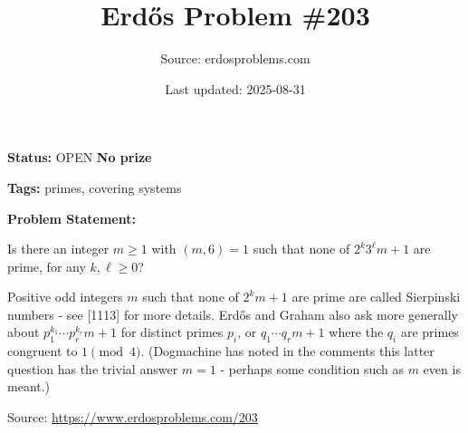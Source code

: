 \documentclass{article}
\title{Erd\H{o}s Problem \#203}
\date{Last updated: 2025-08-31}
\author{Source: erdosproblems.com}
\begin{document}
\maketitle

\noindent\textbf{Status:} OPEN \quad \textbf{No prize}

\noindent\textbf{Tags:} primes, covering systems

\medskip

\noindent\textbf{Problem Statement:}

Is there an integer $m\geq 1$ with $(m,6)=1$ such that none of $2^k3^\ell m+1$ are prime, for any $k,\ell\geq 0$?




Positive odd integers $m$ such that none of $2^km+1$ are prime are called Sierpinski numbers - see [1113] for more details. Erd\H{o}s and Graham also ask more generally about $p_1^{k_1}\cdots p_r^{k_r}m+1$ for distinct primes $p_i$, or $q_1\cdots q_rm+1$ where the $q_i$ are primes congruent to $1\pmod{4}$. (Dogmachine has noted in the comments this latter question has the trivial answer $m=1$ - perhaps some condition such as $m$ even is meant.)


\bigskip
\noindent\small{Source: \url{https://www.erdosproblems.com/203}}
\end{document}
